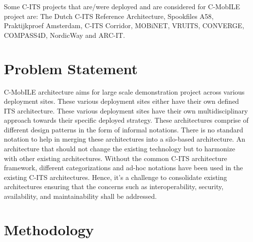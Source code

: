 \documentclass[conference]{IEEEtran}
\begin{document}
Some C-ITS projects that are/were deployed and are considered for C-MobILE project are: The Dutch C-ITS Reference Architecture\cite{ditcm}, Spookfiles A58\cite{shockwave}, Praktijkproef Amsterdam\cite{praktijkproefams}, C-ITS Corridor\cite{corridor}, MOBiNET\cite{mobinet}, VRUITS\cite{vruits}, CONVERGE\cite{converge}, COMPASS4D\cite{compass4d}, NordicWay\cite{nordicway} and ARC-IT\cite{arcit}.

\section{Problem Statement}

C-MobILE architecture aims for large scale demonstration project across various deployment sites. These various deployment sites either have their own defined ITS architecture. These various deployment sites have their own multidisciplinary approach towards their specific deployed strategy. These architectures comprise of different design patterns in the form of informal notations. There is no standard notation to help in merging these architectures into a silo-based architecture. An architecture that should not change the existing technology but to harmonize with other existing architectures. Without the common C-ITS architecture framework, different categorizations and ad-hoc notations have been used in the existing C-ITS architectures. Hence, it's a challenge to consolidate existing architectures ensuring that the concerns such as interoperability, security, availability, and maintainability shall be addressed. 

\section{Methodology}
\end{document}
